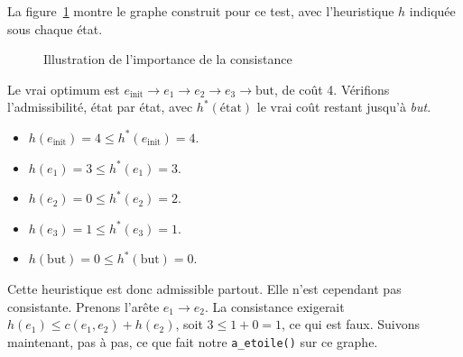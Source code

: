 \documentclass[11pt,a4paper]{article}
\begin{document}
La figure~\ref{fig:contre-exemple} montre le graphe construit pour ce
test, avec l'heuristique $h$ indiquée sous chaque état.

\begin{figure}[H]
\centering
{}
\caption{Illustration de l'importance de la consistance}
\label{fig:contre-exemple}
\end{figure}

Le vrai optimum est $e_{\text{init}} \to e_1 \to e_2 \to e_3 \to
\text{but}$, de coût 4. Vérifions l'admissibilité, état par état, avec
$h^*(\text{état})$ le vrai coût restant jusqu'à \emph{but}.
\begin{itemize}
    \item $h(e_{\text{init}}) = 4 \le h^*(e_{\text{init}}) = 4$.
    \item $h(e_1) = 3 \le h^*(e_1) = 3$.
    \item $h(e_2) = 0 \le h^*(e_2) = 2$.
    \item $h(e_3) = 1 \le h^*(e_3) = 1$.
    \item $h(\text{but}) = 0 \le h^*(\text{but}) = 0$.
\end{itemize}
Cette heuristique est donc admissible partout. Elle n'est cependant pas consistante. Prenons l'arête $e_1 \to e_2$. La consistance exigerait $h(e_1) \le c(e_1,e_2) + h(e_2)$, soit $3 \le 1+0=1$, ce qui est faux. Suivons maintenant, pas à pas, ce que fait notre \texttt{a\_etoile()} sur
ce graphe.
\end{document}
